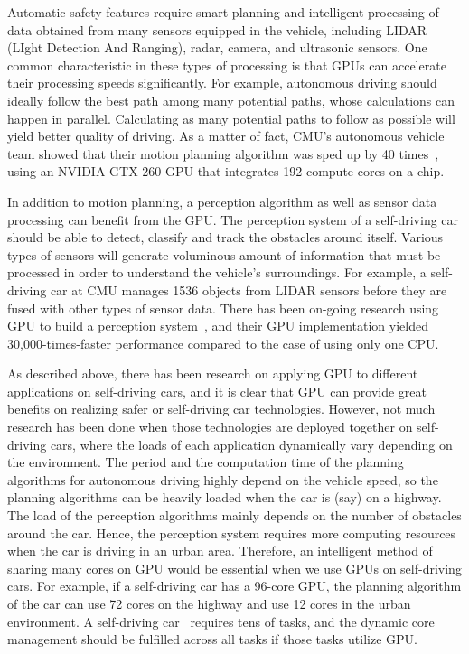 \documentclass{acm_proc_article-sp}
\begin{document}
Automatic safety features require smart planning and intelligent
processing of data obtained from many sensors equipped in the vehicle,
including LIDAR (LIght Detection And Ranging), radar, camera, and
ultrasonic sensors. 
One common characteristic in these types of processing is that GPUs can
accelerate their processing speeds significantly.
For example, autonomous driving should ideally follow the best path among
many potential paths, whose calculations can happen in parallel.
Calculating as many potential paths to follow as possible
will yield better quality of driving.
As a matter of fact, CMU's autonomous vehicle team showed that their
motion planning algorithm was sped up by 40 times~\cite{McNaughton11},
using an NVIDIA GTX 260 GPU that integrates 192 compute cores on a
chip.

In addition to motion planning, a perception algorithm as well as 
sensor data processing can benefit from the GPU.
The perception system of a self-driving car should
be able to detect, classify and track the obstacles around
itself. Various types of sensors will generate voluminous amount of
information that must be processed in order to understand the vehicle's surroundings. 
For example, a self-driving car at CMU manages 1536 objects from LIDAR
sensors before they are fused with other types of sensor data. There has
been on-going research using GPU to build a perception
system~\cite{Ferreira11}, and their GPU implementation yielded
30,000-times-faster performance compared to the case of using only one CPU. 

As described above, there has been research on applying GPU to different applications on self-driving cars, and it is clear that GPU can provide great benefits on realizing safer or self-driving car technologies. However, not much research has been done when those technologies are deployed together on self-driving cars, where the loads of each application dynamically vary depending on the environment. The period and the computation time of the planning algorithms for autonomous driving highly depend on the vehicle speed, so the planning algorithms can be heavily loaded when the car is (say) on a highway. The load of the perception algorithms mainly depends on the number of obstacles around the car. Hence, the perception system requires more computing resources when the car is driving in an urban area. Therefore, an intelligent method of sharing many cores on GPU would be essential when we use GPUs on self-driving cars. For example, if a self-driving car has a 96-core GPU, the planning algorithm of the car can use 72 cores on the highway and use 12 cores in the urban environment. A self-driving car~\cite{Urmson08} requires tens of tasks, and the dynamic core management should be fulfilled across all tasks if those tasks utilize GPU. 
\end{document}
